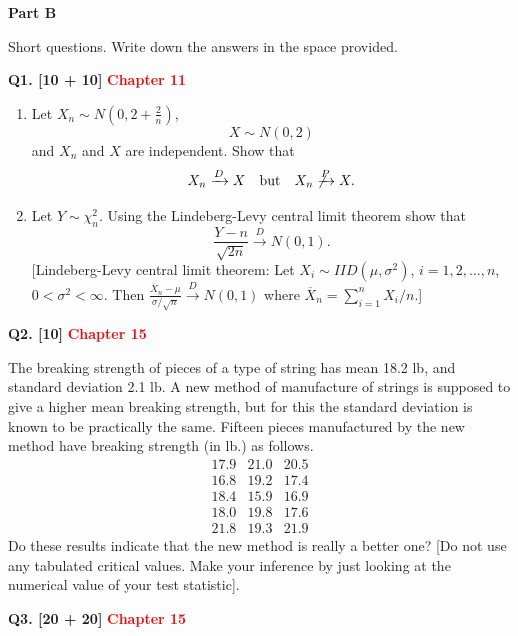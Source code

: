 \documentclass[11pt]{article}
\begin{document}
\clearpage

\begin{center}
\textbf{Part B}
\end{center}

Short questions. Write down the answers in the space provided.

\medskip
\textbf{Q1. [10 + 10]}  \textbf{\textcolor{red}{Chapter 11}}

\begin{enumerate}
\setlength{\itemsep}{8pt}\setlength{\parsep}{0pt}\setlength{\topsep}{3pt}
\item[(a)] Let $X_n\sim N(0,2+\frac{2}{n})$,
\[
X\sim N(0,2)
\]
and $X_n$ and $X$ are independent. Show that
\[
X_n\xrightarrow{D}X\quad\text{but}\quad X_n\not\xrightarrow{P}X.
\]
\item[(b)] Let $Y\sim\chi_n^2$. Using the Lindeberg-Levy central limit theorem show that
\[
\frac{Y-n}{\sqrt{2n}}\xrightarrow{D}N(0,1).
\]
[Lindeberg-Levy central limit theorem: Let $X_i\sim IID(\mu,\sigma^2)$, $i=1,2,\ldots,n$, $0<\sigma^2<\infty$. Then
$\displaystyle\frac{\overline{X}_n-\mu}{\sigma/\sqrt{n}}\xrightarrow{D}N(0,1)$
where $\displaystyle\overline{X}_n=\sum_{i=1}^n X_i/n$.]
\end{enumerate}

\bigskip
\textbf{Q2. [10]}  \textbf{\textcolor{red}{Chapter 15}}

The breaking strength of pieces of a type of string has mean 18.2 lb, and standard deviation 2.1 lb. A new method of manufacture of strings is supposed to give a higher mean breaking strength, but for this the standard deviation is known to be practically the same. Fifteen pieces manufactured by the new method have breaking strength (in lb.) as follows.
\[
\begin{array}{ccc}
17.9&21.0&20.5\\
16.8&19.2&17.4\\
18.4&15.9&16.9\\
18.0&19.8&17.6\\
21.8&19.3&21.9
\end{array}
\]
Do these results indicate that the new method is really a better one? [Do not use any tabulated critical values. Make your inference by just looking at the numerical value of your test statistic].

\bigskip
\textbf{Q3. [20 + 20]}  \textbf{\textcolor{red}{Chapter 15}}
\end{document}
